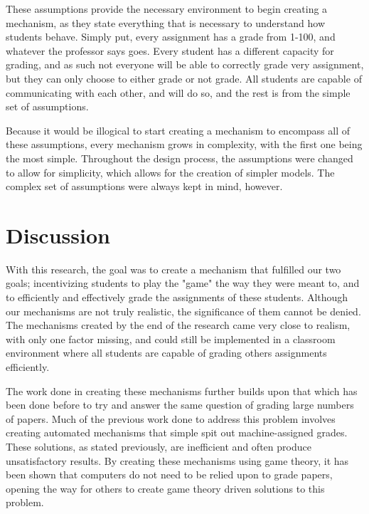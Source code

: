 \documentclass[12pt, Arial]{article}
\begin{document}
These assumptions provide the necessary environment to begin creating a mechanism, as they state everything that is necessary to understand how students behave. Simply put, every assignment has a grade from 1-100, and whatever the professor says goes. Every student has a different capacity for grading, and as such not everyone will be able to correctly grade very assignment, but they can only choose to either grade or not grade. All students are capable of communicating with each other, and will do so, and the rest is from the simple set of assumptions.

Because it would be illogical to start creating a mechanism to encompass all of these assumptions, every mechanism grows in complexity, with the first one being the most simple. Throughout the design process, the assumptions were changed to allow for simplicity, which allows for the creation of simpler models. The complex set of assumptions were always kept in mind, however.

\section{Discussion}
With this research, the goal was to create a mechanism that fulfilled our two goals; incentivizing students to play the "game" the way they were meant to, and to efficiently and effectively grade the assignments of these students. Although our mechanisms are not truly realistic, the significance of them cannot be denied. The mechanisms created by the end of the research came very close to realism, with only one factor missing, and could still be implemented in a classroom environment where all students are capable of grading others assignments efficiently.

The work done in creating these mechanisms further builds upon that which has been done before to try and answer the same question of grading large numbers of papers. Much of the previous work done to address this problem involves creating automated mechanisms that simple spit out machine-assigned grades. These solutions, as stated previously, are inefficient and often produce unsatisfactory results. By creating these mechanisms using game theory, it has been shown that computers do not need to be relied upon to grade papers, opening the way for others to create game theory driven solutions to this problem.
\end{document}
